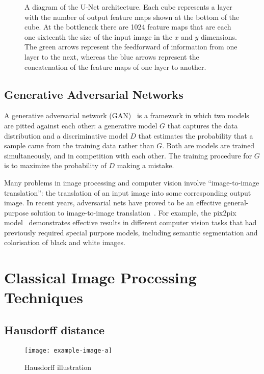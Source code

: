 \begin{figure}[t]
    \centering
    
    \caption{A diagram of the U-Net architecture. Each cube represents a layer with the number of output feature maps shown at the bottom of the cube. At the bottleneck there are 1024 feature maps that are each one sixteenth the size of the input image in the $x$ and $y$ dimensions. The green arrows represent the feedforward of information from one layer to the next, whereas the blue arrows represent the concatenation of the feature maps of one layer to another.}
    \label{fig:unet}
\end{figure}

\subsection{Generative Adversarial Networks}

A generative adversarial network (GAN)~\cite{gans} is a framework in which two models are pitted against each other: a generative model $G$ that captures the data distribution and a discriminative model $D$ that estimates the probability that a sample came from the training data rather than $G$. Both are models are trained simultaneously, and in competition with each other. The training procedure for $G$ is to maximize the probability of $D$ making a mistake.

Many problems in image processing and computer vision involve ``image-to-image translation'': the translation of an input image into some corresponding output image. In recent years, adversarial nets have proved to be an effective general-purpose solution to image-to-image translation~\cite{gansoverview}. For example, the pix2pix model~\cite{pix2pix} demonstrates effective results in different computer vision tasks that had previously required special purpose models, including semantic segmentation and colorisation of black and white images.

\section{Classical Image Processing Techniques}

\subsection{Hausdorff distance}
\label{sec:hausdorff}

\begin{figure}[h]
    \centering
    \texttt{[image: example-image-a]}
    \caption{Hausdorff illustration}
    \label{fig:hausdorff}
\end{figure}

